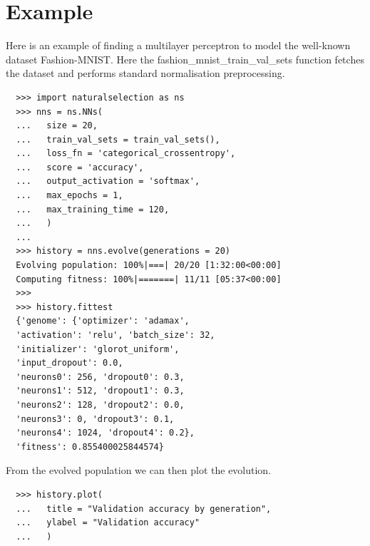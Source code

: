 \documentclass[sigconf]{acmart}
\begin{document}
\maketitle

\section{Example}

Here is an example of finding a multilayer perceptron to model the well-known dataset Fashion-MNIST. Here the \textsf{fashion\_mnist\_train\_val\_sets} function fetches the dataset and performs standard normalisation preprocessing.

\lstset{caption = Evolution of a population of MLPs}
\begin{lstlisting}
  >>> import naturalselection as ns
  >>> nns = ns.NNs(
  ...   size = 20,
  ...   train_val_sets = train_val_sets(),
  ...   loss_fn = 'categorical_crossentropy',
  ...   score = 'accuracy',
  ...   output_activation = 'softmax',
  ...   max_epochs = 1,
  ...   max_training_time = 120,
  ...   )
  ...
  >>> history = nns.evolve(generations = 20)
  Evolving population: 100%|===| 20/20 [1:32:00<00:00]
  Computing fitness: 100%|=======| 11/11 [05:37<00:00]
  >>> 
  >>> history.fittest
  {'genome': {'optimizer': 'adamax', 
  'activation': 'relu', 'batch_size': 32, 
  'initializer': 'glorot_uniform', 
  'input_dropout': 0.0, 
  'neurons0': 256, 'dropout0': 0.3, 
  'neurons1': 512, 'dropout1': 0.3,
  'neurons2': 128, 'dropout2': 0.0, 
  'neurons3': 0, 'dropout3': 0.1,
  'neurons4': 1024, 'dropout4': 0.2}, 
  'fitness': 0.855400025844574}
\end{lstlisting}

From the evolved population we can then plot the evolution.
\lstset{caption = Plotting the evolution}
\begin{lstlisting}
  >>> history.plot(
  ...   title = "Validation accuracy by generation",
  ...   ylabel = "Validation accuracy"
  ...   )
\end{lstlisting}
\end{document}
